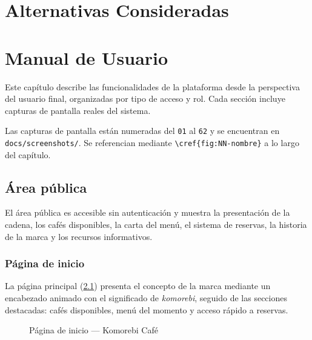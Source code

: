 \documentclass[12pt,a4paper,twoside,openright]{report}
\begin{document}
\chapter{Alternativas Consideradas}
\label{ch:alternativas}

\chapter{Manual de Usuario}
\label{chap:manual}

Este capítulo describe las funcionalidades de la plataforma desde la perspectiva del
usuario final, organizadas por tipo de acceso y rol. Cada sección incluye capturas
de pantalla reales del sistema.

\begin{infobox}
  Las capturas de pantalla están numeradas del \texttt{01} al \texttt{62} y se
  encuentran en \texttt{docs/screenshots/}. Se referencian mediante
  \verb|\cref{fig:NN-nombre}| a lo largo del capítulo.
\end{infobox}

\section{Área pública}
\label{sec:manual-publico}

El área pública es accesible sin autenticación y muestra la presentación de la cadena,
los cafés disponibles, la carta del menú, el sistema de reservas, la historia de la
marca y los recursos informativos.

\subsection{Página de inicio}
La página principal (\cref{fig:01-home}) presenta el concepto de la marca mediante
un encabezado animado con el significado de \textit{komorebi}, seguido de las
secciones destacadas: cafés disponibles, menú del momento y acceso rápido a reservas.

\begin{figure}[H]
  \centering
  \fbox{\rule{0pt}{6cm}\rule{12cm}{0pt}}
  \caption{Página de inicio — Komorebi Café}
  \label{fig:01-home}
\end{figure}
\end{document}
